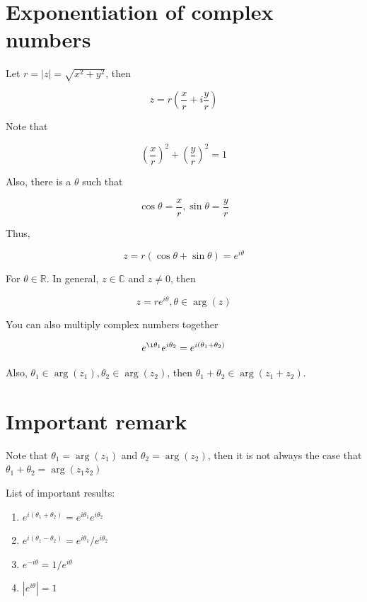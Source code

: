 \documentclass{article}
\newtheorem{one minute paper}[theorem]{One Minute Paper}
\begin{document}
\section*{Exponentiation of complex numbers}

Let $r = |z| = \sqrt{x^2 + y^2}$, then 

\begin{equation}
    z = r\left( \frac{x}{r} + i \frac{y}{r} \right)
\end{equation}

Note that 

\begin{equation}
    \left( \frac{x}{r} \right)^2 + \left( \frac{y}{r} \right)^2 = 1
\end{equation}

Also, there is a $\theta$ such that 

\begin{equation}
    \cos\theta = \frac{x}{r}, \sin\theta = \frac{y}{r}
\end{equation}

Thus, 

\begin{equation}
    z = r(\cos\theta + \sin\theta) = e^{i\theta}
\end{equation}

For $\theta \in \mathbb{R}$. In general, $z \in \mathbb{C}$ and $z \neq 0$, then 

\begin{equation}
    z = re^{i\theta}, \theta \in \arg(z)
\end{equation}

You can also multiply complex numbers together 

\begin{equation}
    e^{\i\theta_1} e^{i\theta_2} = e^{i(\theta_1 + \theta_2)}
\end{equation}

Also, $\theta_1 \in \arg(z_1), \theta_2 \in \arg(z_2)$, then $\theta_1 + \theta_2 \in \arg(z_1 + z_2)$. 

\section*{Important remark}

Note that $\theta_1 = \arg(z_1)$ and $\theta_2 = \arg(z_2)$, then it is not always the case that $\theta_1 + \theta_2 = \arg(z_1z_2)$

List of important results:

\begin{enumerate}
    \item $e^{i(\theta_1 + \theta_2)} = e^{i\theta_1}e^{i\theta_2}$
    \item $e^{i(\theta_1 - \theta_2)} = e^{i\theta_1}/e^{i\theta_2}$
    \item $e^{-i\theta} = 1/e^{i\theta}$
    \item $|e^{i\theta}| = 1$
\end{enumerate}
\end{document}
